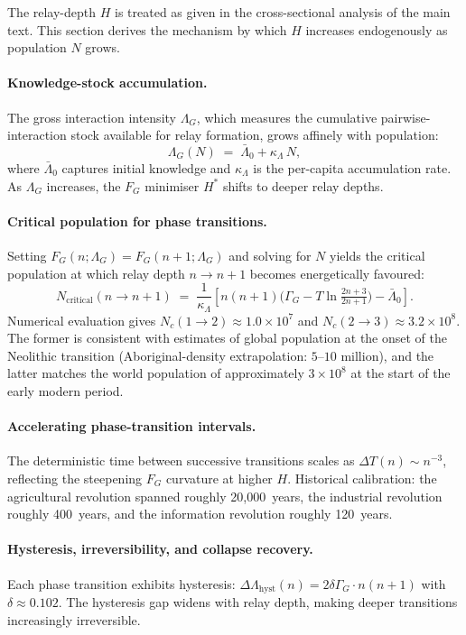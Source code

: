 \documentclass[11pt]{article}
\begin{document}
The relay-depth $H$ is treated as given in the cross-sectional analysis of
the main text. This section derives the mechanism by which $H$ increases
endogenously as population $N$ grows.

\paragraph{Knowledge-stock accumulation.}
The gross interaction intensity $\Lambda_G$, which measures the cumulative
pairwise-interaction stock available for relay formation, grows affinely with
population:
\[
\Lambda_G(N) \;=\; \bar\Lambda_0 + \kappa_\Lambda\,N,
\]
where $\bar\Lambda_0$ captures initial knowledge and $\kappa_\Lambda$ is
the per-capita accumulation rate. As $\Lambda_G$ increases, the $F_G$
minimiser $H^*$ shifts to deeper relay depths.

\paragraph{Critical population for phase transitions.}
Setting $F_G(n;\Lambda_G) = F_G(n+1;\Lambda_G)$ and solving for $N$ yields
the critical population at which relay depth $n\to n+1$ becomes energetically
favoured:
\[
N_{\mathrm{critical}}(n\!\to\!n{+}1)
\;=\;
\frac{1}{\kappa_\Lambda}\!\left[
n(n{+}1)\bigl(\Gamma_G - T\ln\tfrac{2n{+}3}{2n{+}1}\bigr)
- \bar\Lambda_0
\right].
\]
Numerical evaluation gives $N_c(1\!\to\!2)\approx 1.0\times 10^7$ and
$N_c(2\!\to\!3)\approx 3.2\times 10^8$. The former is consistent with
estimates of global population at the onset of the Neolithic transition
(Aboriginal-density extrapolation: $5$--$10$ million), and the latter
matches the world population of approximately $3\times 10^8$ at the start
of the early modern period.

\paragraph{Accelerating phase-transition intervals.}
The deterministic time between successive transitions scales as
$\Delta T(n)\sim n^{-3}$, reflecting the steepening $F_G$ curvature at
higher $H$. Historical calibration: the agricultural revolution spanned
roughly 20,000~years, the industrial revolution roughly 400~years, and
the information revolution roughly 120~years.

\paragraph{Hysteresis, irreversibility, and collapse recovery.}
Each phase transition exhibits hysteresis:
$\Delta\Lambda_{\mathrm{hyst}}(n) = 2\delta\Gamma_G\cdot n(n+1)$
with $\delta\approx 0.102$. The hysteresis gap widens with relay depth,
making deeper transitions increasingly irreversible.
\end{document}
